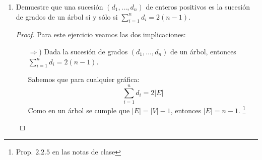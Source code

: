 \documentclass{article}
\begin{document}
\begin{enumerate}
      \begin{proof} Demostración por inducción sobre m

        Paso base (m=1)

        Por definición de hidrocarburo saturado $C_1 k_4 \Longrightarrow$  4 = 2(1)+2 por lo tanto para m=1 se cumple que n=2m+2

        Hipótesis de inducción m = k, si  $C_k H_n \Longrightarrow$ supongamos n=2k+2

        Paso Inductivo

        Pd m=k+1

        Por hipótesis de inducción tenemos que $C_k H_n \Longrightarrow$ n=2k+2 y por paso base $c_1 K_4 \Longrightarrow$ 4=2(1)+2 $\Longrightarrow$ sean r que pertenece a los Naturales sin el 0, sea $C_r$ y $C_1$ donde  $C_r$ pertenece a $C_k H_n$  y $C_1$ pertenece a $C_1 k_4$ tal que r pertenece a ${1,2,3,...,k}$  $\Longrightarrow$  eliminemos 1 hidrógeno a $C_r$ y $C_1 \Longrightarrow C_k H_{n-1}$ y $C_1 k_3$ son iguales a n-1=2k+1 ...(1) y 3=2(1)+1 ...(2) $\Longrightarrow$ uniendo $C_k H_{n-1}$ y $C_1 k_3$ mediante los vertices $C_r$ y $C_1$ $\Longrightarrow C_{k+1} H_{r}$ seria igual a la suma de (1) y (2) $\Longrightarrow$ n+2 = 2(k) + 2(1) +2 $\Longrightarrow$  n+2 = 2(k+1)+2
        $\Longrightarrow$ r=n+2 $\Longrightarrow$  r = 2(k+1)+2. Por lo tanto para $C_{k+1} H_{r}$ r=2(k+1)+2

        Por lo tanto,  para todo m que pertenece a Naturales sin el cero $C_m H_n$ tal que n=2m+2


      \end{proof}

    \item Demuestre que una sucesi\'on $(d_1, \dots,
      d_n)$ de enteros positivos es la sucesi\'on de
      grados de un \'arbol si y s\'olo si
      $\sum_{i=1}^n d_i = 2(n-1)$.

      \renewcommand\qedsymbol{QED}
      \begin{proof}
        Para este ejercicio veamos las dos implicaciones:
        \begin{itemize}
          \item[$\Rightarrow$)] Dada la sucesi\'on de grados $(d_1, \dots, d_n)$ de un
            \'arbol, entonces $\displaystyle \sum_{i=1}^n d_i = 2(n-1)$.

            Sabemos que para cualquier gr\'afica:
            \[
            \sum_{i=1}^n d_i = 2|E|
            \]
            Como en un \'arbol se cumple que $|E| = |V| - 1$, entonces $|E| = n - 1$. \footnote{Prop. $2.2.5$ en las
            notas de clase}


\end{itemize}
\end{proof}
\end{enumerate}
\end{document}
